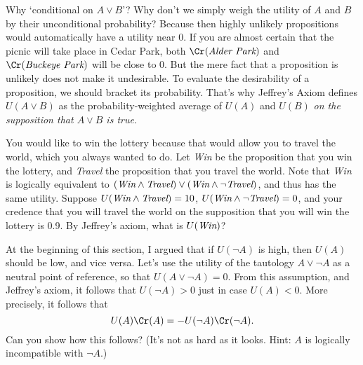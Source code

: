 Why `conditional on $A \lor B$'? Why don't we simply weigh the utility
of $A$ and $B$ by their unconditional probability? Because then highly
unlikely propositions would automatically have a utility near 0. If
you are almost certain that the picnic will take place in Cedar Park,
both $\Cr(\emph{Alder Park})$ and $\Cr(\emph{Buckeye Park})$ will be
close to 0. But the mere fact that a proposition is unlikely does not
make it undesirable. To evaluate the desirability of a proposition, we
should bracket its probability. That's why Jeffrey's Axiom defines
$U(A \lor B)$ as the probability-weighted average of $U(A)$ and $U(B)$ \emph{on
the supposition that $A \lor B$ is true}.

\begin{exercise}{2}
  You would like to win the lottery because that would allow you to
  travel the world, which you always wanted to do. Let \emph{Win} be
  the proposition that you win the lottery, and \emph{Travel} the
  proposition that you travel the world. Note that \emph{Win} is
  logically equivalent to $(\emph{Win} \land \emph{Travel}) \lor
  (\emph{Win} \land \neg \emph{Travel})$, and thus has the same
  utility. Suppose $U(\emph{Win} \land \emph{Travel}) = 10$,
  $U(\emph{Win} \land \neg \emph{Travel}) = 0$, and your credence that
  you will travel the world on the supposition that you will win the
  lottery is 0.9. By Jeffrey's axiom, what is $U(\emph{Win})$?
\end{exercise}

\begin{exercise}{2}
  At the beginning of this section, I argued that if $U(\neg A)$ is
  high, then $U(A)$ should be low, and vice versa. Let's use the
  utility of the tautology $A \lor \neg A$ as a neutral point of
  reference, so that $U(A \lor \neg A) = 0$. From this assumption, and
  Jeffrey's axiom, it follows that $U(\neg A) > 0$ just in case $U(A)
  < 0$. More precisely, it follows that
  \[
  U(A)\Cr(A) = - U(\neg A)\Cr(\neg A).
  \]
  Can you show how this follows? (It's not as hard as it looks. Hint:
  $A$ is logically incompatible with $\neg A$.)
\end{exercise}

